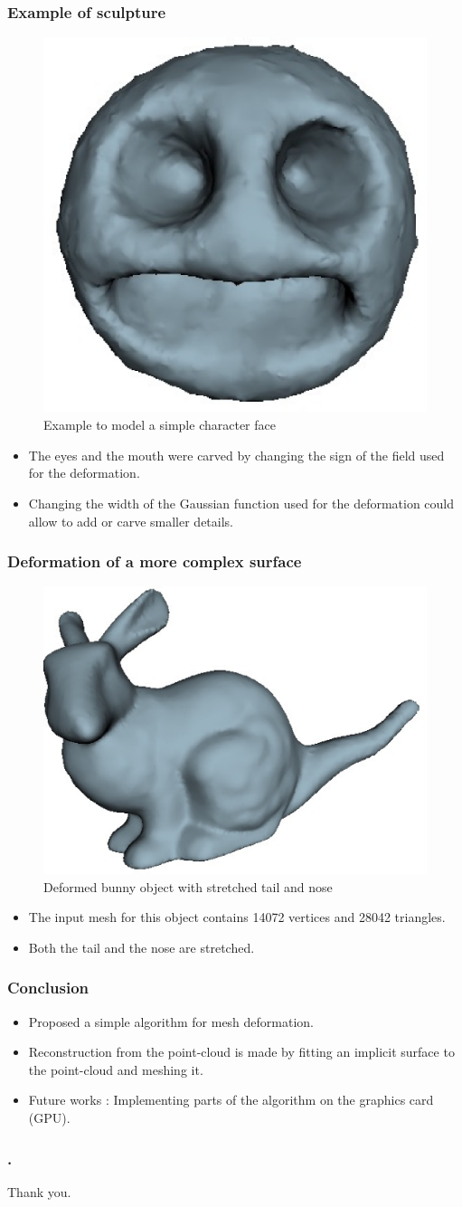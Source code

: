 \documentclass{beamer}
\begin{document}
\begin{frame}
\frametitle{Example of sculpture}
\Large
\begin{figure}
  \centering\includegraphics[width=0.3\columnwidth]{simplefacepoisson2.eps}
  \caption{Example to model a simple character face} \label{fig:face}
\end{figure}
\begin{itemize}
\item The eyes and the mouth were carved by changing the sign of the field used for the deformation.
\item Changing the width of the Gaussian function used for the deformation could allow to add or carve smaller details.
\end{itemize}
\end{frame}

\begin{frame}
\frametitle{Deformation of a more complex surface}
\begin{figure}
  \centering\includegraphics[width=0.4\columnwidth]{deformedbunnypoisson.eps}
  \caption{Deformed bunny object with stretched tail and nose} \label{fig:bunnyPoisson}
\end{figure}

\Large
\begin{itemize}
\item The input mesh for this object contains 14072 vertices and 28042 triangles.
\item  Both the tail and the nose are stretched.
\end{itemize}


\end{frame}

\begin{frame}
\frametitle{Conclusion}
\begin{itemize}
\item Proposed a simple algorithm for mesh deformation.
\item Reconstruction from the point-cloud is made by fitting an implicit surface to the point-cloud and meshing it.
\item Future works : Implementing parts of the algorithm on the graphics card (GPU).
\end{itemize}
\end{frame}
\begin{frame}
\frametitle{ {\color{blue}.}}
\centering
\Large
Thank you.

\end{frame}
\end{document}
